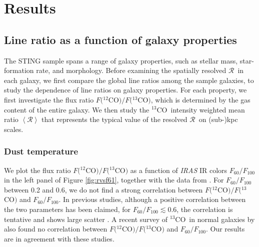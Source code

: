 \documentclass{emulateapj}
\def\ttco{\mbox{$^{13}$CO}}
\def\twco{\mbox{$^{12}$CO}}
\def\rtt{$\mathcal{R}$}
\begin{document}
\section{Results} \label{sec:results}

\subsection{Line ratio as a function of galaxy properties} \label{sec:global}

The STING sample spans a range of galaxy properties,
such as stellar mass, star-formation rate, and morphology.
Before examining the spatially resolved \rtt \ in each
galaxy, we first compare the global line ratios among the sample galaxies,
to study the dependence of 
line ratios on galaxy properties. 
For each property, we first investigate the flux ratio   $F($\twco$)/F($\ttco$)$, which 
 is determined by the gas content of the entire galaxy. 
We then study the \ttco \ intensity weighted mean ratio 
$\left<\mathcal{R}\right>$ that represents the typical value of the resolved \rtt \ on (sub-)kpc scales.  

\subsubsection{Dust temperature}

\begin{figure*}
\caption{
\textit{Left}: Flux ratio $F($\twco$)/F($\ttco$)$ vs. the far-IR flux 
ratio at 60 and 100 $\rm \mu m$ ($F_{60}/F_{100}$), with the 
color circles representing the STING galaxies and the 
black diamonds showing samples from \citet{Crocker2012}. 
For the STING galaxies, 
the vertical error bars
show the uncertainty in the flux ratio. 
\textit{Right}: \ttco \ intensity weighted mean ratio 
$\left<\mathcal{R}\right>$  vs. $F_{60}/F_{100}$. 
The vertical error bars
show the \ttco \  intensity weighted standard deviation of \rtt. 
}
\label{fig:rvsf61}
\end{figure*}

We plot the flux ratio $F($\twco$)/F($\ttco$)$ as a function 
of \textit{IRAS} IR colors $F_{60}/F_{100}$ in the left panel of Figure \ref{fig:rvsf61},
together with the data from \citet{Crocker2012}.
For $F_{60}/F_{100}$ between 0.2 and 0.6, we do not find 
a strong correlation between $F($\twco$)/F($\ttco$)$ and $F_{60}/F_{100}$.
In previous studies, although a positive correlation between
the two parameters has been claimed,
for  $F_{60}/F_{100} \lesssim  0.6$, the correlation 
is tentative and shows large scatter
\citep{Y&S1986,Aalto1995, S&I1991,  Crocker2012}. 
A recent survey of \ttco \ in normal galaxies by \citet{Vila-Vilaro2015} 
also found no correlation between $F($\twco$)/F($\ttco$)$ and $F_{60}/F_{100}$.  
Our results are in agreement with these studies. 
\end{document}
